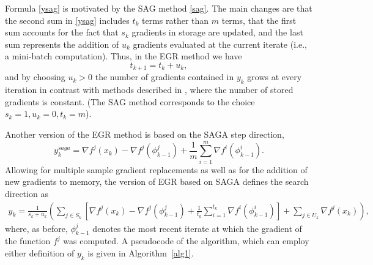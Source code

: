 \documentclass[11pt]{article}
\begin{document}
Formula \eqref{ysag} is motivated by the SAG method \eqref{sag}.   The main changes are that the  second sum in \eqref{ysag}  includes $t_k$ terms rather than $m$ terms, that the first sum accounts for the fact that $s_k$ gradients in storage are updated, and the last sum represents the addition of $ u_k$ gradients evaluated at the current iterate (i.e., a mini-batch computation).  Thus, in the EGR method we have 
\begin{equation}   \label{tdef}
     t_{k+1}= t_{k} + u_k, 
\end{equation}
and by choosing $u_k >0$  the number of gradients contained in $y_k$ grows at every iteration in contrast with methods described in 
\cite{johnson2013accelerating,NIPS2014_5258,shalev2013stochastic,mairal2015incremental,defazio2014finito},
 where the number of stored gradients is constant. (The SAG method corresponds to the choice $s_k=1, u_k =0, t_k=m$).
 
 Another version of the EGR method is based on the SAGA \cite{NIPS2014_5258} step direction,
 \begin{equation}   \label{saga} 
      y_k^{saga}= \nabla f^j(x_k) -  \nabla f^j(\phi_{k-1}^j) +\frac{1}{m}  \sum_{i=1}^{m}  \nabla f^i (\phi^i_{k-1}).
      \end{equation}
Allowing for multiple sample gradient replacements as well as for the addition of new gradients to memory, the version of EGR based on  SAGA  defines the search direction as
\begin{align}  \label{ysaga}
      y_k =  \frac{1}{s_k+u_k} \left(  \sum_{j \in S_k} \left[  \nabla f^j(x_{k}) -   \nabla f^j(\phi_{k-1}^j) + \frac{1}{t_{k}} \sum_{i = 1}^{t_{k} }  \nabla f^i (\phi^i_{k-1})  \right] + \sum_{j \in U_k}  \nabla f^j(x_k)\right),
\end{align}
 where, as before,  $\phi_{k-1}^j$ denotes the most recent iterate at which the gradient of the function $f^j$ was computed.
 A pseudocode of the algorithm, which can employ either definition of $y_k$ is given in Algorithm~\ref{alg1}.
\end{document}
